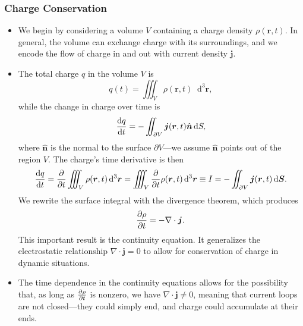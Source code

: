 \documentclass[11pt, a4paper]{article}
\newcommand{\diff}{\mathop{}\!\mathrm{d}} %
\newcommand{\dr}{\diff^{3} \r}  %
\renewcommand{\vec}[1]{\bm{#1}} %
\newcommand{\uvec}[1]{\hat{\vec{#1}}} %
\renewcommand{\r}{\vec{r}}
\renewcommand{\j}{\vec{j}}  %
\renewcommand{\div}{\nabla \cdot}
\begin{document}
\subsubsection{Charge Conservation}
\begin{itemize}
	\item We begin by considering a volume $ V $ containing a charge density $ \rho(\r, t) $. In general, the volume can exchange charge with its surroundings, and we encode the flow of charge in and out with current density $ \j $.
	
	\item The total charge $ q $ in the volume $ V $ is
	\begin{equation*}
		q(t) = \iiint_{V}\rho(\r, t)\dr,
	\end{equation*}
	while the change in charge over time is
	\begin{equation*}
		\dv{q}{t} = - \iint_{\partial V} \j(\r, t)\uvec{n}\diff S,
	\end{equation*}
	where $ \uvec{n} $ is the normal to the surface $ \partial V $---we assume $ \uvec{n} $ points out of the region $ V $. The charge's time derivative is then
	\begin{equation*}
		\dv{q}{t} = \pdv{t}\iiint_{V} \rho(\r, t)\dr = \iiint_{V} \pdv{t}\rho(\r, t)\dr \equiv I = - \iint_{\partial V} \j(\r, t)\diff \vec{S}.
	\end{equation*}
	We rewrite the surface integral with the divergence theorem, which produces
	\begin{equation*}
		\pdv{\rho}{t} = - \div \j.
	\end{equation*}
	This important result is the continuity equation. It generalizes the electrostatic relationship $ \div \j = 0 $ to allow for conservation of charge in dynamic situations.
	
    \item The time dependence in the continuity equations allows for the possibility that, as long as $ \pdv{\rho}{t} $ is nonzero, we have $ \div \j \neq 0 $, meaning that current loops are not closed---they could simply end, and charge could accumulate at their ends. 

\end{itemize}
\end{document}

